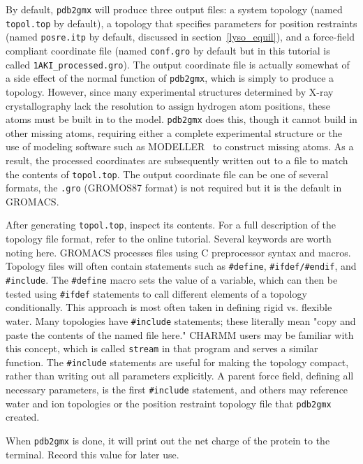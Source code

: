 \documentclass[9pt,tutorial]{livecoms}
\begin{document}
By default, \texttt{pdb2gmx} will produce three output files: a system topology (named \texttt{topol.top} by default), a topology that specifies parameters for position restraints (named \texttt{posre.itp} by default, discussed in section~\ref{lyso_equil}), and a force-field compliant coordinate file (named \texttt{conf.gro} by default but in this tutorial is called \texttt{1AKI\_processed.gro}). The output coordinate file is actually somewhat of a side effect of the normal function of \texttt{pdb2gmx}, which is simply to produce a topology. However, since many experimental structures determined by X-ray crystallography lack the resolution to assign hydrogen atom positions, these atoms must be built in to the model. \texttt{pdb2gmx} does this, though it cannot build in other missing atoms, requiring either a complete experimental structure or the use of modeling software such as MODELLER~\cite{Sali1993} to construct missing atoms. As a result, the processed coordinates are subsequently written out to a file to match the contents of \texttt{topol.top}. The output coordinate file can be one of several formats, the \texttt{.gro} (GROMOS87 format) is not required but it is the default in GROMACS.

After generating \texttt{topol.top}, inspect its contents. For a full description of the topology file format, refer to the online tutorial. Several keywords are worth noting here. GROMACS processes files using C preprocessor syntax and macros. Topology files will often contain statements such as \texttt{\#define}, \texttt{\#ifdef/\#endif}, and \texttt{\#include}. The \texttt{\#define} macro sets the value of a variable, which can then be tested using \texttt{\#ifdef} statements to call different elements of a topology conditionally. This approach is most often taken in defining rigid vs. flexible water. Many topologies have \texttt{\#include} statements; these literally mean "copy and paste the contents of the named file here." CHARMM users may be familiar with this concept, which is called \texttt{stream} in that program and serves a similar function. The \texttt{\#include} statements are useful for making the topology compact, rather than writing out all parameters explicitly. A parent force field, defining all necessary parameters, is the first \texttt{\#include} statement, and others may reference water and ion topologies or the position restraint topology file that \texttt{pdb2gmx} created.

When \texttt{pdb2gmx} is done, it will print out the net charge of the protein to the terminal. Record this value for later use.
\end{document}
